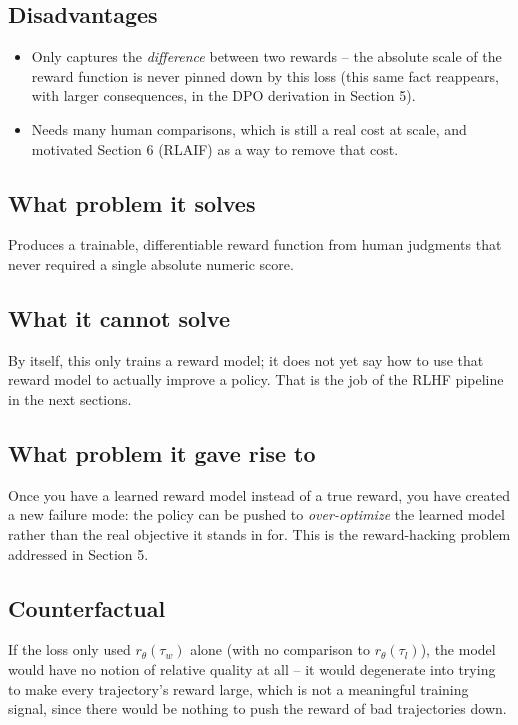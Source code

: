 \documentclass[11pt]{article}
\begin{document}
\subsection{Disadvantages}
\begin{itemize}
  \item Only captures the \emph{difference} between two rewards -- the absolute
  scale of the reward function is never pinned down by this loss (this same fact
  reappears, with larger consequences, in the DPO derivation in Section 5).
  \item Needs many human comparisons, which is still a real cost at scale, and
  motivated Section 6 (RLAIF) as a way to remove that cost.
\end{itemize}

\subsection{What problem it solves}
Produces a trainable, differentiable reward function from human judgments that
never required a single absolute numeric score.

\subsection{What it cannot solve}
By itself, this only trains a reward model; it does not yet say how to use that
reward model to actually improve a policy. That is the job of the RLHF pipeline
in the next sections.

\subsection{What problem it gave rise to}
Once you have a learned reward model instead of a true reward, you have created a
new failure mode: the policy can be pushed to \emph{over-optimize} the learned
model rather than the real objective it stands in for. This is the reward-hacking
problem addressed in Section 5.

\subsection{Counterfactual}
If the loss only used $r_\theta(\tau_w)$ alone (with no comparison to
$r_\theta(\tau_l)$), the model would have no notion of relative quality at all --
it would degenerate into trying to make every trajectory's reward large, which is
not a meaningful training signal, since there would be nothing to push the reward
of bad trajectories down.
\end{document}
